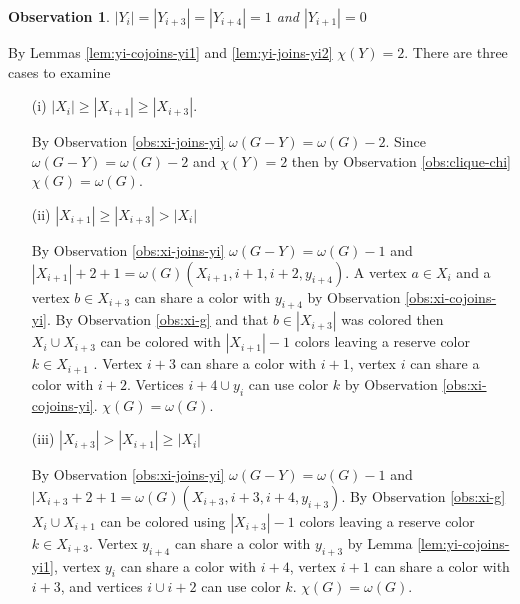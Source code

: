 \documentclass[12pt]{article}
\newtheorem{Observation}[Theorem]{Observation}
\begin{document}
\begin{Observation}\label{obs:yi-yi3-yi4} 
$|Y_{i}| = |Y_{i+3}| = |Y_{i+4}| = 1$ and $|Y_{i+1}| = 0$
\end{Observation} 
\begin{minipage}{0.5\textwidth}%
	By Lemmas \ref{lem:yi-cojoins-yi1} and \ref{lem:yi-joins-yi2} $\chi(Y) = 2$. There are three cases to examine
	\begin{itemize}
	\item[(i)]
		$|X_i| \geq |X_{i+1}| \geq |X_{i+3}|$.

		By Observation \ref{obs:xi-joins-yi} $\omega(G - Y) = \omega(G) - 2$. Since $\omega(G - Y) = \omega(G) - 2$ and $\chi(Y) = 2$ then by Observation \ref{obs:clique-chi} $\chi(G) = \omega(G)$. 
	\item[(ii)]
		$|X_{i+1}| \geq |X_{i+3}| > |X_i|$

		By Observation \ref{obs:xi-joins-yi} $\omega(G - Y) = \omega(G) - 1$ and $|X_{i+1}| + 2 + 1 = \omega(G) (X_{i+1}, i+1, i+2, y_{i+4})$. A vertex $a \in X_i$ and a vertex $b \in X_{i+3}$ can share a color with $y_{i+4}$ by Observation \ref{obs:xi-cojoins-yi}. By Observation \ref{obs:xi-g} and that $b \in |X_{i+3}|$ was colored then $X_{i} \cup X_{i+3}$ can be colored with $|X_{i+1}| - 1$ colors leaving a reserve color $k \in X_{i+1}$ . Vertex $i+3$ can share a color with $i+1$, vertex $i$ can share a color with $i+2$. Vertices $i+4 \cup y_{i}$ can use color $k$ by Observation \ref{obs:xi-cojoins-yi}. $\chi(G) = \omega(G)$.

	\item[(iii)]
		$|X_{i+3}| >  |X_{i+1}| \geq |X_i|$

		By Observation \ref{obs:xi-joins-yi} $\omega(G - Y) = \omega(G) - 1$ and $|X_{i+3} + 2 + 1 = \omega(G) (X_{i+3}, i+3, i+4, y_{i+3})$. By Observation \ref{obs:xi-g} $X_i \cup X_{i+1}$ can be colored using $|X_{i+3}| -1 $ colors leaving a reserve color $k \in X_{i+3}$. Vertex $y_{i+4}$ can share a color with $y_{i+3}$ by Lemma \ref{lem:yi-cojoins-yi1}, vertex $y_i$ can share a color with $i+4$, vertex $i+1$ can share a color with $i+3$, and vertices $i \cup i+2$ can use color $k$. $\chi(G) = \omega(G)$. 
	\end{itemize}
\end{minipage}
\hfill
\end{document}
